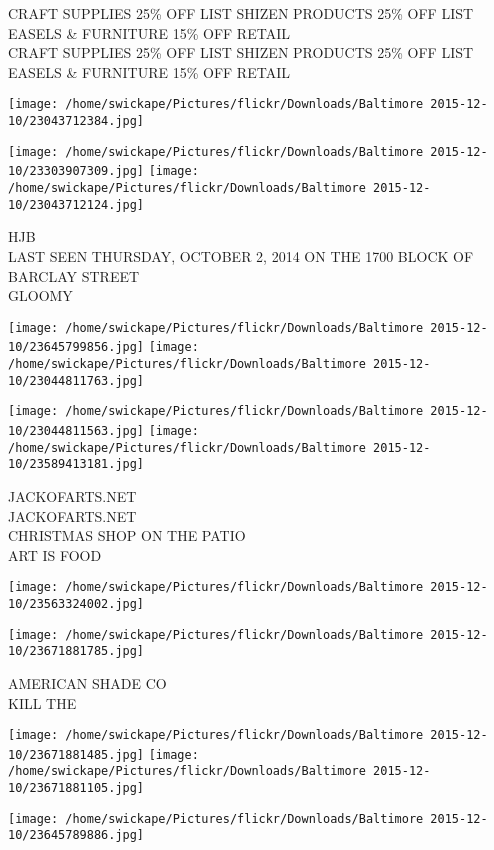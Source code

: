 \documentclass[10pt,letterpaper]{article}
\begin{document}
CRAFT SUPPLIES 25\% OFF LIST SHIZEN PRODUCTS 25\% OFF LIST EASELS \& FURNITURE 15\% OFF RETAIL\\
CRAFT SUPPLIES 25\% OFF LIST SHIZEN PRODUCTS 25\% OFF LIST EASELS \& FURNITURE 15\% OFF RETAIL
\pagebreak

\texttt{[image: /home/swickape/Pictures/flickr/Downloads/Baltimore 2015-12-10/23043712384.jpg]}

\vspace{0.25in}
\texttt{[image: /home/swickape/Pictures/flickr/Downloads/Baltimore 2015-12-10/23303907309.jpg]}
\texttt{[image: /home/swickape/Pictures/flickr/Downloads/Baltimore 2015-12-10/23043712124.jpg]}

HJB\\
LAST SEEN THURSDAY, OCTOBER 2, 2014 ON THE 1700 BLOCK OF BARCLAY STREET\\
GLOOMY
\pagebreak

\texttt{[image: /home/swickape/Pictures/flickr/Downloads/Baltimore 2015-12-10/23645799856.jpg]}
\texttt{[image: /home/swickape/Pictures/flickr/Downloads/Baltimore 2015-12-10/23044811763.jpg]}

\texttt{[image: /home/swickape/Pictures/flickr/Downloads/Baltimore 2015-12-10/23044811563.jpg]}
\texttt{[image: /home/swickape/Pictures/flickr/Downloads/Baltimore 2015-12-10/23589413181.jpg]}

JACKOFARTS.NET\\
JACKOFARTS.NET\\
CHRISTMAS SHOP ON THE PATIO\\
ART IS FOOD
\pagebreak

\texttt{[image: /home/swickape/Pictures/flickr/Downloads/Baltimore 2015-12-10/23563324002.jpg]}

\vspace{0.25in}
\texttt{[image: /home/swickape/Pictures/flickr/Downloads/Baltimore 2015-12-10/23671881785.jpg]}

AMERICAN SHADE CO\\
KILL THE
\pagebreak

\texttt{[image: /home/swickape/Pictures/flickr/Downloads/Baltimore 2015-12-10/23671881485.jpg]}
\texttt{[image: /home/swickape/Pictures/flickr/Downloads/Baltimore 2015-12-10/23671881105.jpg]}

\vspace{0.25in}
\texttt{[image: /home/swickape/Pictures/flickr/Downloads/Baltimore 2015-12-10/23645789886.jpg]}
\end{document}
